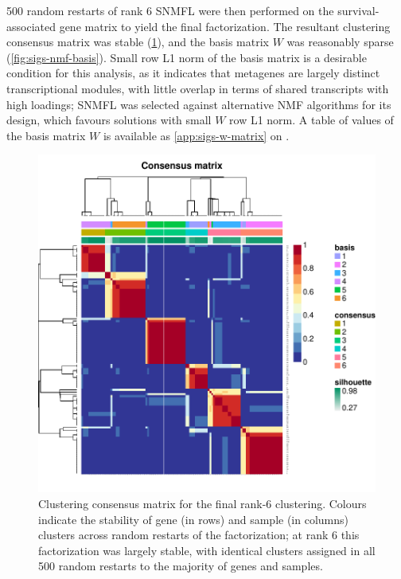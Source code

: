 \documentclass[dissertation.tex]{subfiles}
\begin{document}
500 random restarts of rank 6 \gls{SNMFL} were then performed on the survival-associated gene matrix to yield the final factorization.  The resultant clustering consensus matrix was stable (\cref{fig:sigs-nmf-consensus}), and the basis matrix $W$ was reasonably sparse (\cref{fig:sigs-nmf-basis}).  Small row L1 norm of the basis matrix is a desirable condition for this analysis, as it indicates that metagenes are largely distinct transcriptional modules, with little overlap in terms of shared transcripts with high loadings; \gls{SNMFL} was selected against alternative \gls{NMF} algorithms for its design, which favours solutions with small $W$ row L1 norm.  A table of values of the basis matrix $W$ is available as \cref{app:sigs-w-matrix} on .

\begin{figure}
\centering
\includegraphics[width=.7\linewidth]{analysis/biosurv/reports/18_SIS_diag_dsd_final/figure/nmf-plots-1}
\caption{Clustering consensus matrix for the final rank-6 clustering.  Colours indicate the stability of gene (in rows) and sample (in columns) clusters across random restarts of the factorization; at rank 6 this factorization was largely stable, with identical clusters assigned in all 500 random restarts to the majority of genes and samples.\label{fig:sigs-nmf-consensus}}
\end{figure}
\end{document}
